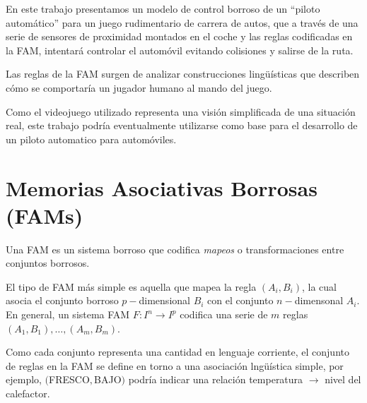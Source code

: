 \documentclass[conference,spanish,a4paper,10pt,oneside,final]{tfmpd}
\begin{document}




En este trabajo presentamos un modelo de control borroso de un ``piloto
automático'' para un juego rudimentario de carrera de autos, que a través de una serie de
sensores de proximidad montados en el coche y las reglas codificadas en la FAM,
intentará controlar el automóvil evitando colisiones y salirse de la ruta.


Las reglas de la FAM surgen de analizar construcciones lingüísticas que describen
cómo se comportaría un jugador humano al mando del juego.

Como el videojuego utilizado representa una visión simplificada de una situación real, este trabajo 
podría eventualmente utilizarse como base para el desarrollo de un piloto automatico para automóviles.
%
%
%
%
\section{Memorias Asociativas Borrosas (FAMs)}
Una FAM es un sistema borroso que codifica \emph{mapeos} o transformaciones entre
conjuntos borrosos. 

El tipo de FAM más simple es aquella que mapea la regla $(A_i,B_i)$, la cual asocia
el conjunto borroso $p-$dimensional $B_i$ con el conjunto $n-$dimensonal $A_i$.
En general, un sistema FAM $F: I^n \rightarrow I^p$ codifica una serie de $m$ reglas
$(A_1,B_1),\ldots,(A_m,B_m)$.

Como cada conjunto representa una cantidad en lenguaje corriente, el conjunto de
reglas en la FAM se define en torno a una asociación lngüística simple, por ejemplo,
$($FRESCO$,$BAJO$)$ podría indicar una relación temperatura $\rightarrow$ nivel del
calefactor.
\end{document}
